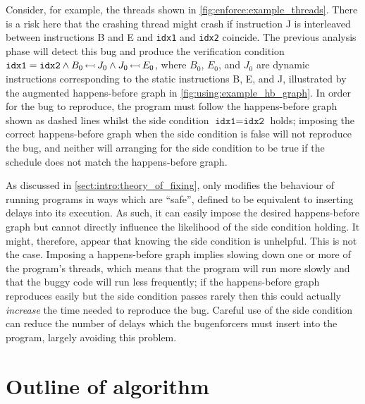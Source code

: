 Consider, for example, the threads shown in
\autoref{fig:enforce:example_threads}.  There is a risk here that the
crashing thread might crash if instruction J is interleaved between
instructions B and E and \texttt{idx1} and \texttt{idx2} coincide.
The previous analysis phase will detect this bug and produce the
verification condition $\texttt{idx1} = \texttt{idx2} \wedge
B_0\,{\leftarrowtail}\,J_0 \wedge J_0\,{\leftarrowtail}\,E_0$, where
$B_0$, $E_0$, and $J_0$ are dynamic instructions corresponding to the
static instructions B, E, and J, illustrated by the augmented
happens-before graph in \autoref{fig:using:example_hb_graph}.  In
order for the bug to reproduce, the program must follow the
happens-before graph shown as dashed lines whilst the \gls{side
  condition} $\texttt{idx1} = \texttt{idx2}$ holds; imposing the
correct happens-before graph when the \gls{side condition} is false
will not reproduce the bug, and neither will arranging for the
\gls{side condition} to be true if the schedule does not match the
happens-before graph.

As discussed in \autoref{sect:intro:theory_of_fixing}, {\technique}
only modifies the behaviour of running programs in ways which are
``safe'', defined to be equivalent to inserting delays into its
execution.  As such, it can easily impose the desired happens-before
graph but cannot directly influence the likelihood of the \gls{side
  condition} holding.  It might, therefore, appear that knowing the
\gls{side condition} is unhelpful.  This is not the case.  Imposing a
happens-before graph implies slowing down one or more of the program's
threads, which means that the program will run more slowly and that
the buggy code will run less frequently; if the happens-before graph
reproduces easily but the \gls{side condition} passes rarely then this
could actually \emph{increase} the time needed to reproduce the bug.
Careful use of the \gls{side condition} can reduce the number of
delays which the \glspl{bugenforcer} must insert into the program,
largely avoiding this problem.

\section{Outline of algorithm}

